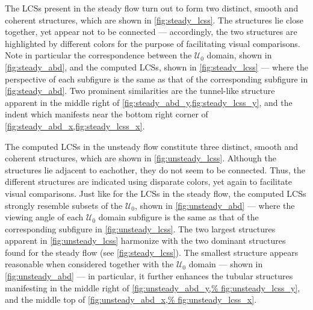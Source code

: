 

The LCSs present in the steady flow turn out to form two distinct,
smooth and coherent structures, which are shown in \cref{fig:steady_lcss}. The
structures lie close together, yet appear not to be connected --- accordingly,
the two structures are highlighted by different colors for the purpose of
facilitating visual comparisons. Note in particular the correspondence between
the $\mathcal{U}_{0}$  domain, shown in \cref{fig:steady_abd}, and the computed
LCSs, shown in \cref{fig:steady_lcss} --- where the perspective of each
subfigure is the same as that of the corresponding subfigure in
\cref{fig:steady_abd}. Two prominent similarities are the tunnel-like structure
apparent in the middle right of \cref{fig:steady_abd_y,fig:steady_lcss_y}, and
the indent which manifests near the bottom right corner of
\cref{fig:steady_abd_x,fig:steady_lcss_x}.



The computed LCSs in the unsteady flow constitute three distinct, smooth and
coherent structures, which are shown in \cref{fig:unsteady_lcss}. Although
the structures lie adjacent to eachother, they do not seem to be connected.
Thus, the different structures are indicated using disparate colors, yet
again to facilitate visual comparisons. Just like for the LCSs in the steady
flow, the computed LCSs strongly resemble subsets of the $\mathcal{U}_{0}$,
shown in \cref{fig:unsteady_abd} --- where the viewing angle of each
$\mathcal{U}_{0}$ domain subfigure is the same as that of the corresponding
subfigure in \cref{fig:unsteady_lcss}. The two largest structures apparent in
\cref{fig:unsteady_lcss} harmonize with the two dominant structures found for
the steady flow (see \cref{fig:steady_lcss}). The smallest structure appears
reasonable when considered together with the $\mathcal{U}_{0}$ domain --- shown
in \cref{fig:unsteady_abd} --- in particular, it further enhances the
tubular structures manifesting in the middle right of \cref{fig:unsteady_abd_y,%
    fig:unsteady_lcss_y}, and the middle top of \cref{fig:unsteady_abd_x,%
fig:unsteady_lcss_x}.




